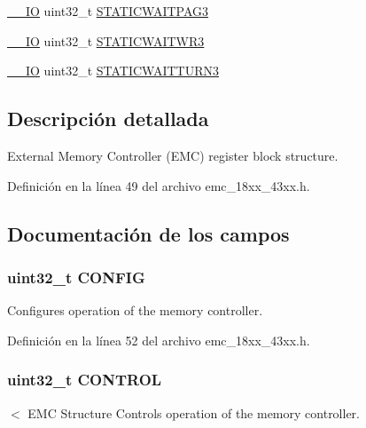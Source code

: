 \begin{DoxyCompactItemize}
\item 
\hyperlink{core__sc300_8h_aec43007d9998a0a0e01faede4133d6be}{\+\_\+\+\_\+\+IO} uint32\+\_\+t \hyperlink{struct_l_p_c___e_m_c___t_af066c6eaa502e952bbdb8ae4ba81c42a}{S\+T\+A\+T\+I\+C\+W\+A\+I\+T\+P\+A\+G3}
\item 
\hyperlink{core__sc300_8h_aec43007d9998a0a0e01faede4133d6be}{\+\_\+\+\_\+\+IO} uint32\+\_\+t \hyperlink{struct_l_p_c___e_m_c___t_a1b10905feb5017bb1f9c40950d79dc58}{S\+T\+A\+T\+I\+C\+W\+A\+I\+T\+W\+R3}
\item 
\hyperlink{core__sc300_8h_aec43007d9998a0a0e01faede4133d6be}{\+\_\+\+\_\+\+IO} uint32\+\_\+t \hyperlink{struct_l_p_c___e_m_c___t_a872cc2a94ab59580d107b36f7f558e41}{S\+T\+A\+T\+I\+C\+W\+A\+I\+T\+T\+U\+R\+N3}
\end{DoxyCompactItemize}


\subsection{Descripción detallada}
External Memory Controller (E\+MC) register block structure. 

Definición en la línea 49 del archivo emc\+\_\+18xx\+\_\+43xx.\+h.



\subsection{Documentación de los campos}
\subsubsection[{\texorpdfstring{C\+O\+N\+F\+IG}{CONFIG}}]{ uint32\+\_\+t C\+O\+N\+F\+IG}\hypertarget{struct_l_p_c___e_m_c___t_aed40378e2ce292435df51ff247d0cb78}{}\label{struct_l_p_c___e_m_c___t_aed40378e2ce292435df51ff247d0cb78}
Configures operation of the memory controller. 

Definición en la línea 52 del archivo emc\+\_\+18xx\+\_\+43xx.\+h.

\subsubsection[{\texorpdfstring{C\+O\+N\+T\+R\+OL}{CONTROL}}]{ uint32\+\_\+t C\+O\+N\+T\+R\+OL}\hypertarget{struct_l_p_c___e_m_c___t_a60054d9772af540ff3d88432d724137f}{}\label{struct_l_p_c___e_m_c___t_a60054d9772af540ff3d88432d724137f}
$<$ E\+MC Structure Controls operation of the memory controller. 

